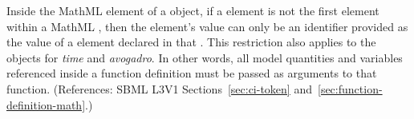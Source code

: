 Inside the  MathML element of a \FunctionDefinition object,
if a  element is not the first element within a MathML
, then the  element's value can only be an
identifier provided as the value of a  element declared in that
.  This restriction also applies to the 
objects for \emph{time} and \emph{avogadro}.  In other words, all model
quantities and variables referenced inside a function definition must be
passed as arguments to that function.  (References: SBML L3V1
Sections~\ref{sec:ci-token} and~\ref{sec:function-definition-math}.)

